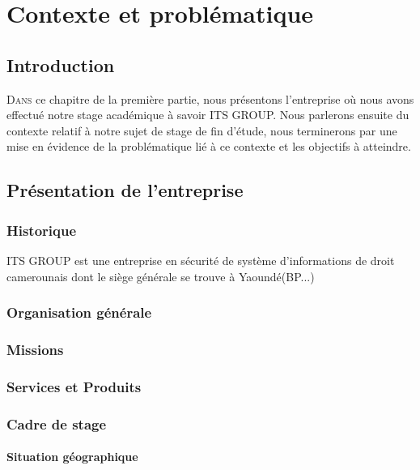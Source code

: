 \chapter{Contexte et problématique}

	\section*{Introduction}
	\lettrine{D}{ans} ce chapitre de la première partie, nous présentons l'entreprise où nous avons effectué notre stage académique à savoir ITS GROUP. Nous parlerons ensuite du contexte relatif à notre sujet de stage de fin d'étude, nous terminerons par une mise en évidence de la problématique lié à ce contexte  et les objectifs à atteindre. 
	

	\section{Présentation de l'entreprise}
		\subsection{Historique}
			ITS GROUP est une entreprise en sécurité de système d'informations de droit camerounais dont le siège générale se trouve à Yaoundé(BP...)
		
		\subsection{Organisation générale}
		
		
		\subsection{Missions}
		
		\subsection{Services et Produits}
		
		\subsection{Cadre de stage}
		
			\subsubsection{Situation géographique}
			
